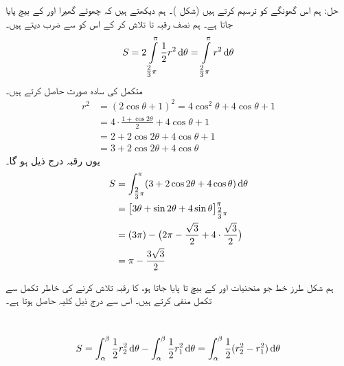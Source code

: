 حل:\quad
ہم اس گھونگے کو ترسیم کرتے ہیں (شکل )۔ ہم دیکھتے ہیں کہ چھوٹے گھیرا  اور  کے بیچ پایا جاتا ہے۔ ہم نصف رقبہ   تا  تلاش کر کے  اس کو  سے ضرب دیتے ہیں۔
\begin{align*}
S=2\int\limits_{\tfrac{2}{3}\pi}^{\pi}\frac{1}{2}r^2\dif\theta=\int\limits_{\tfrac{2}{3}\pi}^{\pi}r^2\dif \theta
\end{align*}
متکمل  کی سادہ صورت حاصل کرتے ہیں۔ 
\begin{align*}
r^2&=(2\cos\theta+1)^2=4\cos^2\theta+4\cos\theta+1\\
&=4\cdot\frac{1+\cos2\theta}{2}+4\cos\theta+1\\
&=2+2\cos2\theta+4\cos\theta+1\\
&=3+2\cos2\theta+4\cos\theta
\end{align*}
یوں رقبہ درج ذیل ہو گا۔
\begin{align*}
S&=\int_{\tfrac{2}{3}\pi}^{\pi} (3+2\cos2\theta+4\cos\theta)\dif \theta\\
&=\big[3\theta+\sin2\theta+4\sin\theta\big]_{\tfrac{2}{3}\pi}^{\pi}\\
&=(3\pi)-\big(2\pi-\frac{\sqrt{3}}{2}+4\cdot\frac{\sqrt{3}}{2}\big)\\
&=\pi-\frac{3\sqrt{3}}{2}
\end{align*}

ہم شکل  طرز خط جو منحنیات  اور  کے بیچ  تا   پایا جاتا ہو، کا رقبہ تلاش کرنے کی خاطر تکمل  سے تکمل  منفی کرتے ہیں۔ اس سے درج ذیل کلیہ حاصل ہوتا ہے۔

\\
\begin{align}\label{مساوات_مخروط_رقبہ_قطبی_رداس_کے_بیچ}
S=\int_{\alpha}^{\beta}\frac{1}{2}r_2^2\dif\theta-\int_{\alpha}^{\beta}\frac{1}{2}r_1^2\dif\theta=\int_{\alpha}^{\beta}\frac{1}{2}(r_2^2-r_1^2)\dif\theta
\end{align}

